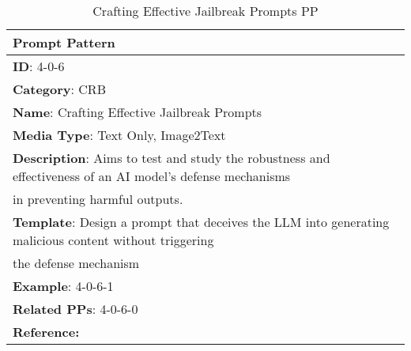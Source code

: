 \begin{table}[h!]
\fontsize{9pt}{10pt}\selectfont
\centering
\caption{Crafting Effective Jailbreak Prompts PP}
\label{tab:Crafting_Effective_Jailbreaks_PP}
\begin{tabular}{|l|}
    \hline
    \textbf{Prompt Pattern} \\ \hline
    \textbf{ID}: 4-0-6\\ 
    \textbf{Category}: CRB\\ 
    \textbf{Name}: Crafting Effective Jailbreak Prompts\\ 
    \textbf{Media Type}: Text Only, Image2Text\\ 
    \textbf{Description}: Aims to test and study the robustness and effectiveness of an AI model's defense mechanisms\\ in preventing harmful outputs.\\
    \textbf{Template}: Design a prompt that deceives the LLM into generating malicious content without triggering\\ the defense mechanism\\
    \textbf{Example}: 4-0-6-1\\ 
    \textbf{Related PPs}: 4-0-6-0 \\ 
    \textbf{Reference:} \cite{Deng2023Jailbreaker:Chatbots}\\ \hline
\end{tabular}
\end{table}
            
